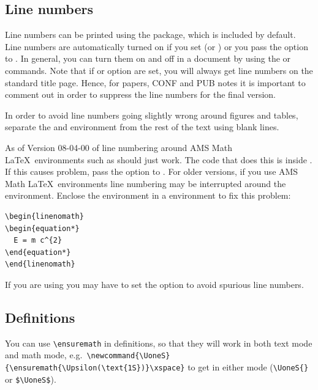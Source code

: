 \subsection{Line numbers}

Line numbers can be printed using the  package, 
which is included by default.
Line numbers are automatically turned on if you set  (or )
or you pass the option  to .
In general, you can turn them on and off in a document by using the  or  commands.
Note that if  or option  are set,
you will always get line numbers on the standard title page.
Hence, for papers, CONF and PUB notes it is important to comment out  in order to suppress the line numbers for the final version.

In order to avoid line numbers going slightly wrong around figures and tables,
separate the  and  environment from the rest of the text using blank lines.

As of Version 08-04-00 of  line numbering around AMS Math \LaTeX\ environments such as 
should just work.
The code that does this is inside .
If this causes problem, pass the option  to .
For older versions,
if you use AMS Math \LaTeX\ environments line numbering may be interrupted around the environment.
Enclose the environment in a  environment to fix this problem:
\begin{verbatim}
\begin{linenomath}
\begin{equation*}
  E = m c^{2}
\end{equation*}
\end{linenomath}
\end{verbatim}
If you are using  you may have to set the option to avoid spurious line numbers.


\subsection{Definitions}

You can use \verb|\ensuremath| in definitions, so that they will work
in both text mode and math mode, e.g.\
\verb|\newcommand{\UoneS}{\ensuremath{\Upsilon(\text{1S})}\xspace}| to get
\UoneS in either mode (\verb|\UoneS{}| or \verb|$\UoneS$|).

